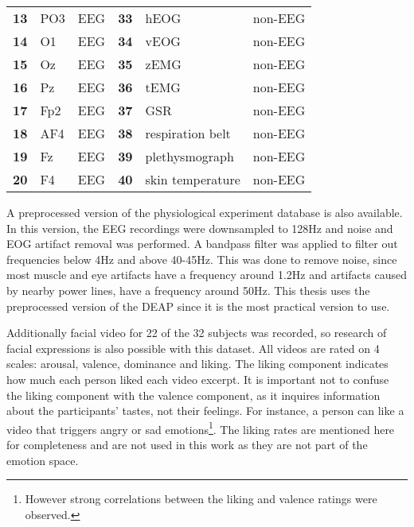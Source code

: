 \begin{table}[H]
\begin{tabular}{l|ll|l|ll}
\textbf{13}      & PO3           & EEG               & \textbf{33}      & hEOG             & non-EEG           \\
\textbf{14}      & O1            & EEG               & \textbf{34}      & vEOG             & non-EEG           \\
\textbf{15}      & Oz            & EEG               & \textbf{35}      & zEMG             & non-EEG           \\
\textbf{16}      & Pz            & EEG               & \textbf{36}      & tEMG             & non-EEG           \\
\textbf{17}      & Fp2           & EEG               & \textbf{37}      & GSR              & non-EEG           \\
\textbf{18}      & AF4           & EEG               & \textbf{38}      & respiration belt & non-EEG           \\
\textbf{19}      & Fz            & EEG               & \textbf{39}      & plethysmograph   & non-EEG           \\
\textbf{20}      & F4            & EEG               & \textbf{40}      & skin temperature & non-EEG          
\end{tabular}
\end{table}

\npar

A preprocessed version of the physiological experiment database is also available. In this version, the EEG recordings were downsampled to 128Hz and noise and EOG artifact removal was performed. A bandpass filter was applied to filter out frequencies below 4Hz and above 40-45Hz. This was done to remove noise, since most muscle and eye artifacts have a frequency around 1.2Hz and artifacts caused by nearby power lines, have a frequency around 50Hz\cite{ExtendedPaper}. This thesis uses the preprocessed version of the DEAP since it is the most practical version to use.

\npar

Additionally facial video for 22 of the 32 subjects was recorded, so research of facial expressions is also possible with this dataset. All videos are rated on 4 scales: arousal, valence, dominance and liking. The liking component indicates how much each person liked each video excerpt. It is important not to confuse the liking component with the valence component, as it inquires information about the participants' tastes, not their feelings. For instance, a person can like a video that triggers angry or sad emotions\footnote{However strong correlations between the liking and valence ratings were observed\citep{DEAP}.}. The liking rates are mentioned here for completeness and are not used in this work as they are not part of the emotion space.

